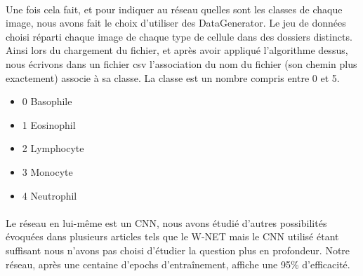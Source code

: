 \paragraph{}
Une fois cela fait, et pour indiquer au réseau quelles sont les classes de chaque image, nous avons fait le choix d’utiliser des DataGenerator. Le jeu de données choisi réparti chaque image de chaque type de cellule dans des dossiers distincts. Ainsi lors du chargement du fichier, et après avoir appliqué l’algorithme dessus, nous écrivons dans un fichier csv l’association du nom du fichier (son chemin plus exactement) associe à sa classe. La classe est un nombre compris entre 0 et 5.
\begin{itemize}
    \item 0 Basophile
    \item 1 Eosinophil
    \item 2 Lymphocyte
    \item 3 Monocyte
    \item 4 Neutrophil
\end{itemize}

\paragraph{}
Le réseau en lui-même est un CNN, nous avons étudié d’autres possibilités évoquées dans plusieurs articles tels que le W-NET mais le CNN utilisé étant suffisant nous n’avons pas choisi d’étudier la question plus en profondeur. Notre réseau, après une centaine d’epochs d’entraînement, affiche une 95\% d’efficacité.

\newpage